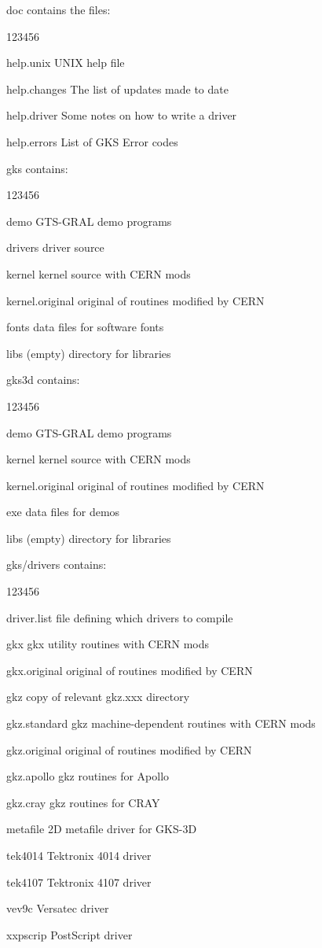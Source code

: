 doc contains the files:
\begin{DLtt}{123456}
\item[help.unix]UNIX help file
\item[help.changes]The list of updates made to date
\item[help.driver]Some notes on how to write a driver
\item[help.errors]List of GKS Error codes
\end{DLtt}
gks contains:
\begin{DLtt}{123456}
\item[demo]GTS-GRAL demo programs
\item[drivers]driver source
\item[kernel]kernel source with CERN mods
\item[kernel.original]original of routines modified by CERN
\item[fonts]data files for software fonts
\item[libs](empty) directory for libraries
\end{DLtt}
gks3d contains:
\begin{DLtt}{123456}
\item[demo]GTS-GRAL demo programs
\item[kernel]kernel source with CERN mods
\item[kernel.original]original of routines modified by CERN
\item[exe]data files for demos
\item[libs](empty) directory for libraries
\end{DLtt}
gks/drivers contains:
\begin{DLtt}{123456}
\item[driver.list]file defining which drivers to compile
\item[gkx]gkx utility routines with CERN mods
\item[gkx.original]original of routines modified by CERN
\item[gkz]copy of relevant gkz.xxx directory
\item[gkz.standard]gkz machine-dependent routines with CERN mods
\item[gkz.original]original of routines modified by CERN
\item[gkz.apollo]gkz routines for Apollo
\item[gkz.cray]gkz routines for CRAY
\item[metafile]2D metafile driver for GKS-3D
\item[tek4014]Tektronix 4014 driver
\item[tek4107]Tektronix 4107 driver
\item[vev9c]Versatec driver
\item[xxpscrip]PostScript driver
\end{DLtt}
